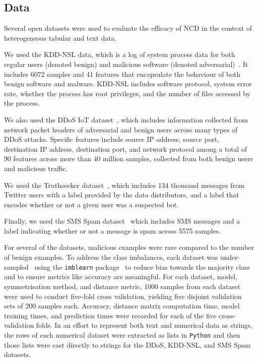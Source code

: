 \documentclass[preprint,12pt]{article}
\begin{document}
\subsection{Data}
\label{datasets}

Several open datasets were used to evaluate the efficacy of NCD in the context of heterogeneous tabular and text data.

We used the KDD-NSL data, which is a log of system process data for both regular users (denoted benign) and malicious software (denoted adversarial)~\cite{kddnsl}. It includes 6072 samples and 41 features that encapsulate the behaviour of both benign software and malware.
KDD-NSL includes software protocol, system error rate, whether the process has root privileges, and the number of files accessed by the process.

We also used the DDoS IoT dataset~\cite{ddos}, which includes information collected from network packet headers of adversarial and benign users across many types of DDoS attacks.
Specific features include source IP address, source port, destination IP address, destination port, and network protocol among a total of 90 features across more than 40 million samples, collected from both benign users and malicious traffic.

We used the Truthseeker dataset~\cite{truthseeker}, which includes 134 thousand messages from Twitter users with a label provided by the data distributors, and a label that encodes whether or not a given user was a suspected bot.

Finally, we used the SMS Spam dataset~\cite{sms_spam} which includes SMS messages and a label indicating whether or not a message is spam across 5575 samples.

For several of the datasets, malicious examples were rare compared to the number of benign examples. To address the class imbalances, each dataset was under-sampled~\cite{undersampling} using the \texttt{imblearn} package~\cite{imblearn} to reduce bias towards the majority class and to ensure metrics like accuracy are meaningful.
For each dataset, model, symmetrisation method, and distance metric, 1000 samples from each dataset were used to conduct five-fold cross validation, yielding five disjoint validation sets of 200 samples each.
Accuracy, distance matrix computation time, model training times, and prediction times were recorded for each of the five cross-validation folds.
In an effort to represent both text and numerical data as strings, the rows of each numerical dataset were extracted as lists in \texttt{Python} and then those lists were cast directly to strings for the DDoS, KDD-NSL, and SMS Spam datasets.
\end{document}
